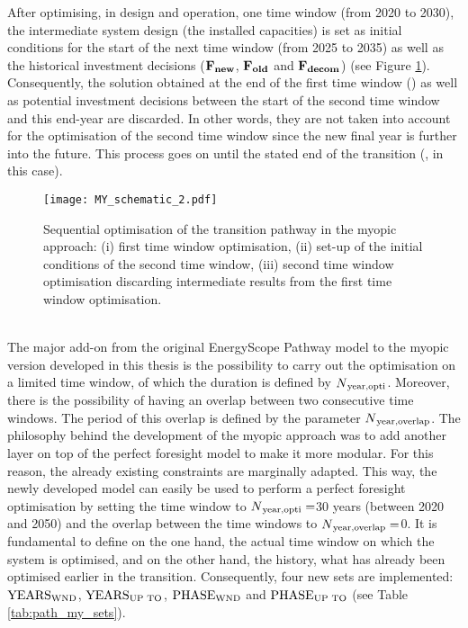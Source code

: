 After optimising, in design and operation, one time window (\eg from 2020 to 2030), the intermediate system design (\ie the installed capacities) is set as initial conditions for the start of the next time window (\eg from 2025 to 2035) as well as the historical investment decisions (\ie $\textbf{F\textsubscript{new}}$, $\textbf{F\textsubscript{old}}$ and $\textbf{F\textsubscript{decom}}$) (see Figure \ref{fig:my_schematic_2}). Consequently, the solution obtained at the end of the first time window () as well as potential investment decisions between the start of the second time window and this end-year are discarded. In other words, they are not taken into account for the optimisation of the second time window since the new final year is further into the future. This process goes on until the stated end of the transition (, in this case).

\begin{figure}[htbp!]
\centering
\texttt{[image: MY\_schematic\_2.pdf]}
\caption{Sequential optimisation of the transition pathway in the myopic approach: (i) first time window optimisation, (ii) set-up of the initial conditions of the second time window, (iii) second time window optimisation discarding intermediate results from the first time window optimisation.}
\label{fig:my_schematic_2}
\end{figure}

\\

\noindent
The major add-on from the original EnergyScope Pathway model \cite{limpens2021generating} to the myopic version developed in this thesis is the possibility to carry out the optimisation on a limited time window, of which the duration is defined by $N\textsubscript{year,opti}$. Moreover, there is the possibility of having an overlap between two consecutive time windows. The period of this overlap is defined by the parameter $N\textsubscript{year,overlap}$. The philosophy behind the development of the myopic approach was to add another layer on top of the perfect foresight model to make it more modular. For this reason, the already existing constraints are marginally adapted. This way, the newly developed model can easily be used to perform a perfect foresight optimisation by setting the time window to $N\textsubscript{year,opti}=$30 years (\ie between 2020 and 2050) and the overlap between the time windows to $N\textsubscript{year,overlap}=$0. It is fundamental to define on the one hand, the actual time window on which the system is optimised, and on the other hand, the history, \ie what has already been optimised earlier in the transition. Consequently, four new sets are implemented: $\text{YEARS}\textsubscript{WND}$, $\text{YEARS}\textsubscript{UP TO}$, $\text{PHASE}\textsubscript{WND}$ and $\text{PHASE}\textsubscript{UP TO}$ (see Table \ref{tab:path_my_sets}).

